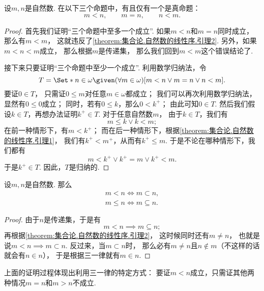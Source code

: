 \begin{theorem}\label{theorem:集合论.自然数集的三一律}
设\(m,n\)是自然数.
在以下三个命题中，有且仅有一个是真命题：\begin{equation*}
	m < n, \qquad
	m = n, \qquad
	n < m.
\end{equation*}
\begin{proof}
首先我们证明“三个命题中至多一个成立”.
如果\(m < n\)和\(m = n\)同时成立，
那么有\(m < m\)，
这就违反了\cref{theorem:集合论.自然数的线性序.引理2}.
另外，如果\(m < n < m\)成立，
那么根据\(m\)是传递集，
那么我们回到\(m < m\)这个错误结论了.

接下来只要证明“三个命题中至少一个成立”.
利用数学归纳法，令\begin{equation*}
	T = \Set*{
		n \in \omega
		\given
		(\forall m \in \omega)
		[
			m < n
			\lor
			m = n
			\lor
			n < m
		]
	}.
\end{equation*}
要证\(0 \in T\)，
只需证\(0 \leq m\)对任意\(m \in \omega\)都成立；
我们可以再次利用数学归纳法，
显然有\(0 \leq 0\)成立；
同时，若有\(0 \leq k\)，那么\(0 < k^+\)；
由此可知\(0 \in T\).
然后我们假设\(k \in T\)，再想办法证明\(k^+ \in T\).
对于任意自然数\(m\)，
由于\(k \in T\)，我们有\begin{equation*}
	m \leq k
	\lor
	k < m;
\end{equation*}
在前一种情形下，有\(m < k^+\)；
而在后一种情形下，根据\cref{theorem:集合论.自然数的线性序.引理1}，
我们有\(k^+ < m^+\)，从而有\(k^+ \leq m\).
于是不论在哪种情形下，我们都有\begin{equation*}
	m < k^+
	\lor
	k^+ = m
	\lor
	k^+ < m.
\end{equation*}
于是\(k^+ \in T\).
因此，\(T\)是归纳的.
\end{proof}
\end{theorem}

\begin{corollary}\label{theorem:集合论.自然数集的三一律.推论1}
设\(m,n\)是自然数.
那么\begin{gather*}
	m < n \iff m \subset n, \\
	m \leq n \iff m \subseteq n.
\end{gather*}
\begin{proof}
由于\(n\)是传递集，于是有\begin{equation*}
	m < n \implies m \subseteq n;
\end{equation*}
再根据\cref{theorem:集合论.自然数的线性序.引理2}，
这时候同时还有\(m \neq n\)，
也就是说\(m < n \implies m \subset n\).
反过来，当\(m \subset n\)时，
那么必有\(m \neq n\)且\(n \notin m\)（不这样的话就会有\(n \in n\)），
于是根据三一律就有\(m \in n\).
\end{proof}
\end{corollary}
上面的证明过程体现出利用三一律的特定方式：
要证\(m < n\)成立，只需证其他两种情况\(m = n\)和\(m > n\)不成立.

